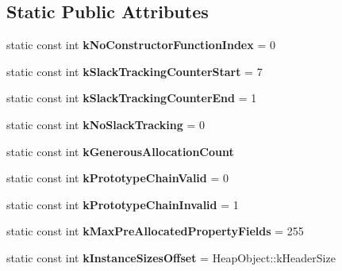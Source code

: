 \subsection*{Static Public Attributes}
\begin{DoxyCompactItemize}
\item 
static const int {\bfseries k\+No\+Constructor\+Function\+Index} = 0\hypertarget{classv8_1_1internal_1_1_map_afc8dc4de958e145987be19341a22c338}{}\label{classv8_1_1internal_1_1_map_afc8dc4de958e145987be19341a22c338}

\item 
static const int {\bfseries k\+Slack\+Tracking\+Counter\+Start} = 7\hypertarget{classv8_1_1internal_1_1_map_a2a0fc5e7e78b7cba657d1888f3448bae}{}\label{classv8_1_1internal_1_1_map_a2a0fc5e7e78b7cba657d1888f3448bae}

\item 
static const int {\bfseries k\+Slack\+Tracking\+Counter\+End} = 1\hypertarget{classv8_1_1internal_1_1_map_a679d4c0a8adf5810eec6f7126bd50c7a}{}\label{classv8_1_1internal_1_1_map_a679d4c0a8adf5810eec6f7126bd50c7a}

\item 
static const int {\bfseries k\+No\+Slack\+Tracking} = 0\hypertarget{classv8_1_1internal_1_1_map_a2a2d69d6abc592918fe00f31f4d32a74}{}\label{classv8_1_1internal_1_1_map_a2a2d69d6abc592918fe00f31f4d32a74}

\item 
static const int {\bfseries k\+Generous\+Allocation\+Count}
\item 
static const int {\bfseries k\+Prototype\+Chain\+Valid} = 0\hypertarget{classv8_1_1internal_1_1_map_a1687713a44c12c6eabc699bba2f4a917}{}\label{classv8_1_1internal_1_1_map_a1687713a44c12c6eabc699bba2f4a917}

\item 
static const int {\bfseries k\+Prototype\+Chain\+Invalid} = 1\hypertarget{classv8_1_1internal_1_1_map_a590806059e1dba905eaf67367f03d376}{}\label{classv8_1_1internal_1_1_map_a590806059e1dba905eaf67367f03d376}

\item 
static const int {\bfseries k\+Max\+Pre\+Allocated\+Property\+Fields} = 255\hypertarget{classv8_1_1internal_1_1_map_ad878be44f72b34291a3995a9a9c4783d}{}\label{classv8_1_1internal_1_1_map_ad878be44f72b34291a3995a9a9c4783d}

\item 
static const int {\bfseries k\+Instance\+Sizes\+Offset} = Heap\+Object\+::k\+Header\+Size\hypertarget{classv8_1_1internal_1_1_map_a87c3c5f503d77b60652e9df6a047d21c}{}\label{classv8_1_1internal_1_1_map_a87c3c5f503d77b60652e9df6a047d21c}


\end{DoxyCompactItemize}
